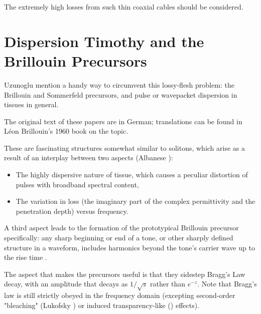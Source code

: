 \documentclass[paper.tex]{subfiles}
\begin{document}
The extremely high losses from such thin coaxial cables should be considered.


\pagebreak
\section{Dispersion Timothy and the Brillouin Precursors}

Uzunoglu \cite{Theoretical2020} mention a handy way to circumvent this lossy-flesh problem: the Brillouin and Sommerfeld precursors\footnotemark, and pulse or wavepacket dispersion in tissues in general.\footnotemark





The original text of these papers are in German; translations can be found in Léon Brillouin's 1960 
book\cite{Wave1960} on the topic. \footnotemark

These are fascinating structures somewhat similar to solitons, which arise as a result of an interplay between two aspects (Albanese 
\cite{Shortrisetime1989}): 

\begin{itemize}
	\item The highly dispersive nature of tissue, which causes a peculiar distortion of pulses with broadband spectral content,
	\item The variation in loss (the imaginary part of the complex permittivity and the penetration depth) versus frequency. 
\end{itemize}


A third aspect leads to the formation of the prototypical Brillouin precursor specifically: any sharp 
beginning or end of a tone, or other sharply defined structure in a waveform, includes harmonics beyond the tone's carrier wave up to the rise time \footnotemark. 

The aspect that makes the precursors useful is that they sidestep Bragg's Law decay, with an amplitude that decays as $1/\sqrt{z}$ rather than $e^{-z}$. Note that Bragg's law is still strictly obeyed in the frequency domain (excepting second-order "bleaching" (Lukofsky \cite{Can}) or induced transparency-like (\cite{Electromagnetically1997}) effects).
\end{document}
